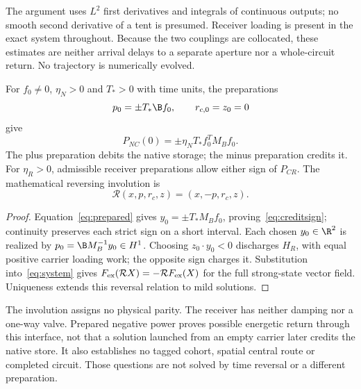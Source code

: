 The argument uses $L^2$ first derivatives and integrals of continuous outputs; no smooth second derivative of a tent is presumed. Receiver loading is present in the exact system throughout. Because the two couplings are collocated, these estimates are neither arrival delays to a separate aperture nor a whole-circuit return. No trajectory is numerically evolved.

\begin{proposition}\label{prop:credit}
For $f_0\ne0$, $\eta_N>0$ and $T_*>0$ with time units, the preparations
\begin{equation}\label{eq:prepared}
 p_0=\pm T_*\B f_0,\qquad r_{c,0}=z_0=0
\end{equation}
give
\begin{equation}\label{eq:creditsign}
 P_{NC}(0)=\pm\eta_N T_*f_0^TM_Bf_0.
\end{equation}
The plus preparation debits the native storage; the minus preparation credits it. For $\eta_R>0$, admissible receiver preparations allow either sign of $P_{CR}$. The mathematical reversing involution is
\begin{equation}\label{eq:reverser}
 \mathcal R(x,p,r_c,z)=(x,-p,r_c,z).
\end{equation}
\end{proposition}
\begin{proof}
Equation~\eqref{eq:prepared} gives $y_0=\pm T_*M_Bf_0$, proving~\eqref{eq:creditsign}; continuity preserves each strict sign on a short interval. Each chosen $y_0\in\R^2$ is realized by $p_0=\B M_B^{-1}y_0\in H^1$. Choosing $z_0\cdot y_0<0$ discharges $H_R$, with equal positive carrier loading work; the opposite sign charges it. Substitution into~\eqref{eq:system} gives $F_{\rm ex}(\mathcal RX)=-\mathcal R F_{\rm ex}(X)$ for the full strong-state vector field. Uniqueness extends this reversal relation to mild solutions.
\end{proof}
The involution assigns no physical parity. The receiver has neither damping nor a one-way valve. Prepared negative power proves possible energetic return through this interface, not that a solution launched from an empty carrier later credits the native store. It also establishes no tagged cohort, spatial central route or completed circuit. Those questions are not solved by time reversal or a different preparation.
